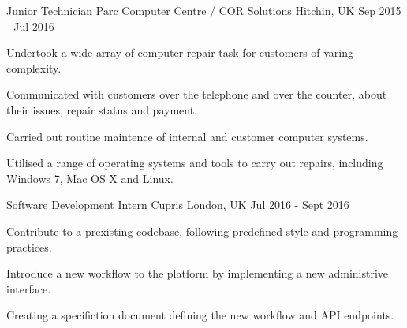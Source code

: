 


\begin{cventries}


\cventry
{Junior Technician} %
{Parc Computer Centre / COR Solutions} %
{Hitchin, UK} %
{Sep 2015 - Jul 2016} %
{ %
\begin{cvitems}
\item {Undertook a wide array of computer repair task for customers of varing complexity.}
\item {Communicated with customers over the telephone and over the counter, about their issues, repair status and payment.}
\item {Carried out routine maintence of internal and customer computer systems.}
\item {Utilised a range of operating systems and tools to carry out repairs, including Windows 7, Mac OS X and Linux.}
\end{cvitems}
}


\cventry
{Software Development Intern} %
{Cupris} %
{London, UK} %
{Jul 2016 - Sept 2016} %
{ %
\begin{cvitems}
\item {Contribute to a prexisting codebase, following predefined style and programming practices.}
\item {Introduce a new workflow to the platform by implementing a new administrive interface.}
\item {Creating a specifiction document defining the new workflow and API endpoints.}
\end{cvitems}
}


\end{cventries}
